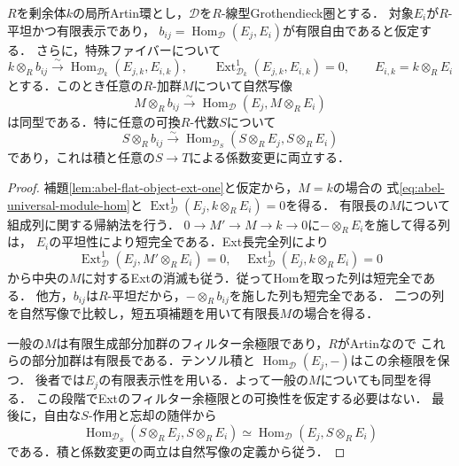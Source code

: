 \begin{proposition}[全係数加群に対するsectionの変更]
\label{prop:abel-universal-line-hom}
$R$を剰余体$k$の局所Artin環とし，$\mathcal D$を$R$-線型Grothendieck圏とする．
対象$E_i$が$R$-平坦かつ有限表示であり，
$b_{ij}=\operatorname{Hom}_{\mathcal D}(E_j,E_i)$が有限自由であると仮定する．
さらに，特殊ファイバーについて
\[
 k\otimes_R b_{ij}\xrightarrow{\sim}
 \operatorname{Hom}_{\mathcal D_k}(E_{j,k},E_{i,k}),
 \qquad
 \operatorname{Ext}^1_{\mathcal D_k}(E_{j,k},E_{i,k})=0,
 \qquad E_{i,k}=k\otimes_R E_i
\]
とする．このとき任意の$R$-加群$M$について自然写像
\begin{equation}\label{eq:abel-universal-module-hom}
 M\otimes_R b_{ij}\xrightarrow{\sim}
 \operatorname{Hom}_{\mathcal D}(E_j,M\otimes_R E_i)
\end{equation}
は同型である．特に任意の可換$R$-代数$S$について
\begin{equation}\label{eq:abel-universal-saturation}
 S\otimes_R b_{ij}\xrightarrow{\sim}
 \operatorname{Hom}_{\mathcal D_S}
 (S\otimes_R E_j,S\otimes_R E_i)
\end{equation}
であり，これは積と任意の$S\to T$による係数変更に両立する．
\end{proposition}
\begin{proof}
補題\ref{lem:abel-flat-object-ext-one}と仮定から，$M=k$の場合の
式\eqref{eq:abel-universal-module-hom}と
$\operatorname{Ext}^1_{\mathcal D}(E_j,k\otimes_R E_i)=0$を得る．
有限長の$M$について組成列に関する帰納法を行う．
$0\to M'\to M\to k\to0$に$-\otimes_R E_i$を施して得る列は，
$E_i$の平坦性により短完全である．Ext長完全列により
\[
 \operatorname{Ext}^1_{\mathcal D}(E_j,M'\otimes_R E_i)=0,
 \quad
 \operatorname{Ext}^1_{\mathcal D}(E_j,k\otimes_R E_i)=0
\]
から中央の$M$に対するExtの消滅も従う．従ってHomを取った列は短完全である．
他方，$b_{ij}$は$R$-平坦だから，$-\otimes_R b_{ij}$を施した列も短完全である．
二つの列を自然写像で比較し，短五項補題を用いて有限長$M$の場合を得る．

一般の$M$は有限生成部分加群のフィルター余極限であり，$R$がArtinなので
これらの部分加群は有限長である．テンソル積と
$\operatorname{Hom}_{\mathcal D}(E_j,-)$はこの余極限を保つ．
後者では$E_j$の有限表示性を用いる．よって一般の$M$についても同型を得る．
この段階でExtのフィルター余極限との可換性を仮定する必要はない．
最後に，自由な$S$-作用と忘却の随伴から
\[
 \operatorname{Hom}_{\mathcal D_S}(S\otimes_R E_j,S\otimes_R E_i)
 \simeq\operatorname{Hom}_{\mathcal D}(E_j,S\otimes_R E_i)
\]
である．積と係数変更の両立は自然写像の定義から従う．
\end{proof}

